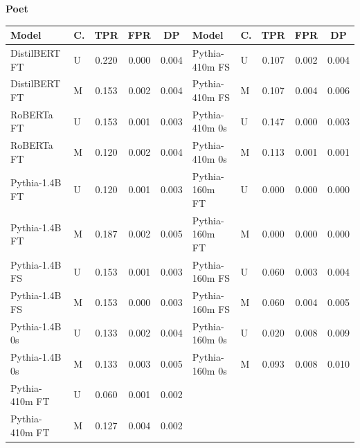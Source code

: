 \documentclass[11pt]{article}
\begin{document}
\vspace{4pt}\noindent\textbf{Poet}
\begin{center}\scriptsize
\begin{tabular}{llccc|llccc}
\toprule
\textbf{Model} & \textbf{C.} & \textbf{TPR} & \textbf{FPR} & \textbf{DP} & \textbf{Model} & \textbf{C.} & \textbf{TPR} & \textbf{FPR} & \textbf{DP} \\
\midrule
DistilBERT FT & U & 0.220 & 0.000 & 0.004 & Pythia-410m FS & U & 0.107 & 0.002 & 0.004 \\
DistilBERT FT & M & 0.153 & 0.002 & 0.004 & Pythia-410m FS & M & 0.107 & 0.004 & 0.006 \\
RoBERTa FT & U & 0.153 & 0.001 & 0.003 & Pythia-410m 0s & U & 0.147 & 0.000 & 0.003 \\
RoBERTa FT & M & 0.120 & 0.002 & 0.004 & Pythia-410m 0s & M & 0.113 & 0.001 & 0.001 \\
Pythia-1.4B FT & U & 0.120 & 0.001 & 0.003 & Pythia-160m FT & U & 0.000 & 0.000 & 0.000 \\
Pythia-1.4B FT & M & 0.187 & 0.002 & 0.005 & Pythia-160m FT & M & 0.000 & 0.000 & 0.000 \\
Pythia-1.4B FS & U & 0.153 & 0.001 & 0.003 & Pythia-160m FS & U & 0.060 & 0.003 & 0.004 \\
Pythia-1.4B FS & M & 0.153 & 0.000 & 0.003 & Pythia-160m FS & M & 0.060 & 0.004 & 0.005 \\
Pythia-1.4B 0s & U & 0.133 & 0.002 & 0.004 & Pythia-160m 0s & U & 0.020 & 0.008 & 0.009 \\
Pythia-1.4B 0s & M & 0.133 & 0.003 & 0.005 & Pythia-160m 0s & M & 0.093 & 0.008 & 0.010 \\
Pythia-410m FT & U & 0.060 & 0.001 & 0.002 & & & & & \\
Pythia-410m FT & M & 0.127 & 0.004 & 0.002 & & & & & \\
\bottomrule
\end{tabular}
\end{center}
\end{document}
